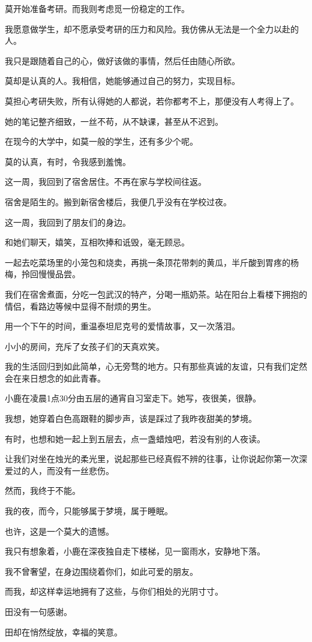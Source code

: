 \documentclass[12pt,a4paper]{article}
\begin{document}
		莫开始准备考研。而我则考虑觅一份稳定的工作。\par
		我愿意做学生，却不愿承受考研的压力和风险。我仿佛从无法是一个全力以赴的人。\par
		我只是跟随着自己的心，做好该做的事情，然后任由随心所欲。\par
		莫却是认真的人。我相信，她能够通过自己的努力，实现目标。\par
		莫担心考研失败，所有认得她的人都说，若你都考不上，那便没有人考得上了。\par
		她的笔记整齐细致，一丝不苟，从不缺课，甚至从不迟到。\par
		在现今的大学中，如莫一般的学生，还有多少个呢。\par
		莫的认真，有时，令我感到羞愧。

		这一周，我回到了宿舍居住。不再在家与学校间往返。\par
		宿舍是陌生的。搬到新宿舍楼后，我便几乎没有在学校过夜。\par
		这一周，我回到了朋友们的身边。\par
		和她们聊天，嬉笑，互相吹捧和诋毁，毫无顾忌。\par
		一起去吃菜场里的小笼包和烧卖，再挑一条顶花带刺的黄瓜，半斤酸到胃疼的杨梅，拎回慢慢品尝。\par
		我们在宿舍煮面，分吃一包武汉的特产，分喝一瓶奶茶。站在阳台上看楼下拥抱的情侣，看路边等候中显得不耐烦的男生。\par
		用一个下午的时间，重温泰坦尼克号的爱情故事，又一次落泪。\par
		小小的房间，充斥了女孩子们的天真欢笑。\par
		我的生活回归到如此简单，心无旁骛的地方。只有那些真诚的友谊，只有我们定然会在来日想念的如此青春。

		小鹿在凌晨1点30分由五层的通宵自习室走下。她写，夜很美，很静。\par
		我想，她穿着白色高跟鞋的脚步声，该是踩过了我昨夜甜美的梦境。\par
		有时，也想和她一起上到五层去，点一盏蜡烛吧，若没有别的人夜读。\par
		让我们对坐在烛光的柔光里，说起那些已经真假不辨的往事，让你说起你第一次深爱过的人，而没有一丝悲伤。\par
		然而，我终于不能。\par
		我的夜，而今，只能够属于梦境，属于睡眠。\par
		也许，这是一个莫大的遗憾。

		我只有想象着，小鹿在深夜独自走下楼梯，见一窗雨水，安静地下落。

		我不曾奢望，在身边围绕着你们，如此可爱的朋友。\par
		而我，却这样幸运地拥有了这些，与你们相处的光阴寸寸。\par
		田没有一句感谢。\par
		田却在悄然绽放，幸福的笑意。
\end{document}
